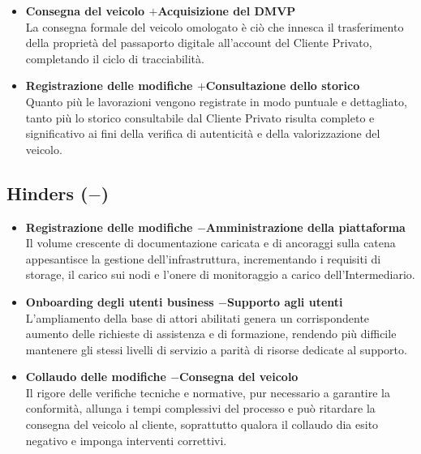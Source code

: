 \begin{itemize}
    \item \textbf{Consegna del veicolo \quad$+$\quad Acquisizione del DMVP}\\
    La consegna formale del veicolo omologato è ciò che innesca il trasferimento della proprietà del passaporto digitale all'account del Cliente Privato, completando il ciclo di tracciabilità.

    \item \textbf{Registrazione delle modifiche \quad$+$\quad Consultazione dello storico}\\
    Quanto più le lavorazioni vengono registrate in modo puntuale e dettagliato, tanto più lo storico consultabile dal Cliente Privato risulta completo e significativo ai fini della verifica di autenticità e della valorizzazione del veicolo.
\end{itemize}

\subsection*{Hinders ($-$)}

\begin{itemize}
    \item \textbf{Registrazione delle modifiche \quad$-$\quad Amministrazione della piattaforma}\\
    Il volume crescente di documentazione caricata e di ancoraggi sulla catena appesantisce la gestione dell'infrastruttura, incrementando i requisiti di storage, il carico sui nodi e l'onere di monitoraggio a carico dell'Intermediario.

    \item \textbf{Onboarding degli utenti business \quad$-$\quad Supporto agli utenti}\\
    L'ampliamento della base di attori abilitati genera un corrispondente aumento delle richieste di assistenza e di formazione, rendendo più difficile mantenere gli stessi livelli di servizio a parità di risorse dedicate al supporto.

    \item \textbf{Collaudo delle modifiche \quad$-$\quad Consegna del veicolo}\\
    Il rigore delle verifiche tecniche e normative, pur necessario a garantire la conformità, allunga i tempi complessivi del processo e può ritardare la consegna del veicolo al cliente, soprattutto qualora il collaudo dia esito negativo e imponga interventi correttivi.
\end{itemize}

